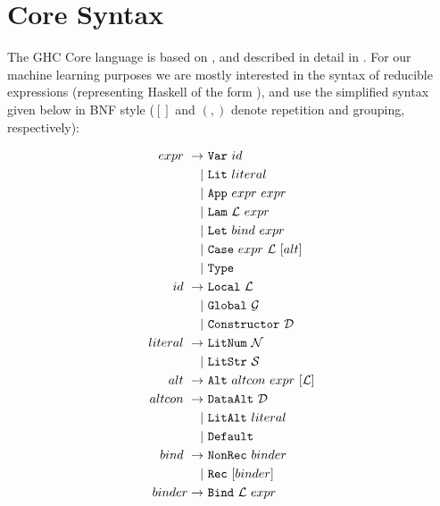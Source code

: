 \appendix

\section{Core Syntax}\label{sec:core}

The GHC Core language is based on \fc{}, and described in detail in \cite[Appendix C]{sulzmann2007system}. For our machine learning purposes we are mostly interested in the syntax of reducible expressions (representing Haskell of the form ), and use the simplified syntax given below in BNF style ($[]$ and $(,)$ denote repetition and grouping, respectively):

\begin{equation}\label{fig:coresyntax}
  \begin{split}
    expr\    \rightarrow\ & \texttt{Var}\ id                          \\
                       |\ & \texttt{Lit}\ literal                     \\
                       |\ & \texttt{App}\ expr\ expr                  \\
                       |\ & \texttt{Lam}\ \mathcal{L}\ expr           \\
                       |\ & \texttt{Let}\ bind\ expr                  \\
                       |\ & \texttt{Case}\ expr\ \mathcal{L}\ [alt]   \\
                       |\ & \texttt{Type}                             \\
    id\      \rightarrow\ & \texttt{Local}\       \mathcal{L}         \\
                       |\ & \texttt{Global}\      \mathcal{G}         \\
                       |\ & \texttt{Constructor}\ \mathcal{D}         \\
    literal\ \rightarrow\ & \texttt{LitNum}\ \mathcal{N}              \\
                       |\ & \texttt{LitStr}\ \mathcal{S}              \\
    alt\     \rightarrow\ & \texttt{Alt}\ altcon\ expr\ [\mathcal{L}] \\
    altcon\  \rightarrow\ & \texttt{DataAlt}\ \mathcal{D}             \\
                       |\ & \texttt{LitAlt}\ literal                  \\
                       |\ & \texttt{Default}                          \\
    bind\    \rightarrow\ & \texttt{NonRec}\ binder                   \\
                       |\ & \texttt{Rec}\ [binder]                    \\
    binder   \rightarrow\ & \texttt{Bind}\ \mathcal{L}\ expr
  \end{split}
\end{equation}
